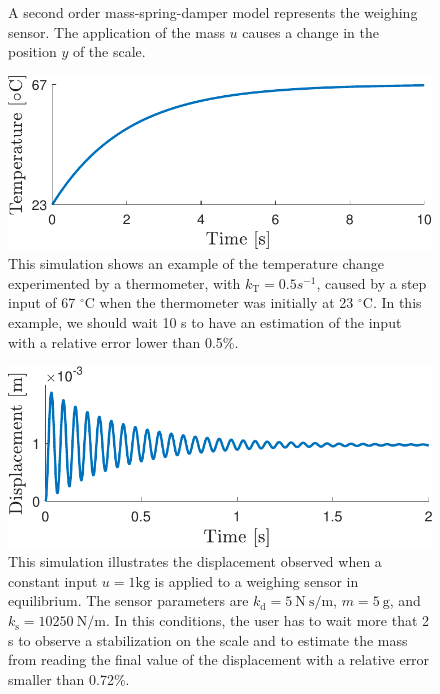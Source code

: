 \begin{figure}[htb!]
\begin{tikzpicture}[every node/.style={draw,outer sep=0pt,thick}]
\end{tikzpicture}

\caption{\label{fig:simple_msd_system} \color{blue} A second order mass-spring-damper model represents the weighing sensor. The application of the mass $u$ causes a change in the position $y$ of the scale. \color{black} } 
\end{figure}


\begin{figure}[!htbp]
\centering
\includegraphics[width=0.69\columnwidth]{./ChapterIntroduction/fig/Fig_2.pdf} 
\caption{ \label{fig:thermometer} 
\color{blue} This simulation shows an example of the temperature change experimented by a thermometer, with $k_{\mathrm{T}}=0.5 s^{-1}$, caused by a step input of 67 $^{\circ} \mathrm{C}$  when the thermometer was initially at 23 $^{\circ} \mathrm{C}$. In this example, we should wait 10 s to have an estimation of the input with a relative error lower than 0.5\%. \color{black} }
\end{figure}

\begin{figure}[!htbp]
\centering
\includegraphics[width=0.69\columnwidth]{./ChapterIntroduction/fig/Fig_3.pdf} 
\caption{ \label{fig:scale} 
\color{blue} This simulation illustrates the displacement observed when a constant input $u=1 \mathrm{kg}$ is applied to a weighing sensor in equilibrium. The sensor parameters are $k_{\mathrm{d}} = 5 \ \mathrm{N \ s/m}$, $m = 5 \ \mathrm{g}$, and $k_{\mathrm{s}} = 10250 \ \mathrm{N/m}$. In this conditions, the user has to wait more that 2 s to observe a stabilization on the scale and to estimate the mass from reading the final value of the displacement with a relative error smaller than 0.72\%. \color{black}  }
\end{figure}

